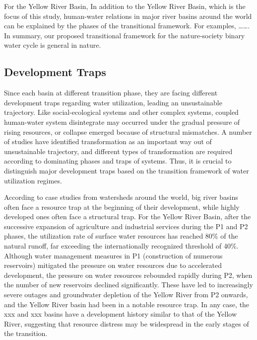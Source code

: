 \documentclass[9pt, twocolumn, twoside, lineno]{pnas-new}
\begin{document}
For the Yellow River Basin, 
In addition to the Yellow River Basin, which is the focus of this study, 
human-water relations in major river basins around the world 
can be explained by the phases of the transitional framework.
For examples, \dots \dots.
In summary, our proposed transitional framework for the nature-society binary water cycle is general in nature.

\subsection*{Development Traps}
Since each basin at different transition phase, 
they are facing different development traps regarding water utilization, 
leading an unsustainable trajectory. 
Like social-ecological systems and other complex systems, 
coupled human-water system disintegrate may occurred under the gradual pressure of rising resources, 
or collapse emerged because of structural mismatches.
A number of studies have identified transformation as an important way out of unsustainable trajectory, 
and different types of transformation are required according to dominating phases and traps of systems.
Thus, it is crucial to distinguish major development traps 
based on the transition framework of water utilization regimes.


According to case studies from watersheds around the world, 
big river basins often face a resource trap at the beginning of their development, 
while highly developed ones often face a structural trap.
For the Yellow River Basin, 
after the successive expansion of agriculture and industrial services during the P1 and P2 phases, 
the utilization rate of surface water resources has reached 80\% of the natural runoff, 
far exceeding the internationally recognized threshold of 40\%.
Although water management measures in P1 (construction of numerous reservoirs) 
mitigated the pressure on water resources due to accelerated development, 
the pressure on water resources rebounded rapidly during P2, 
when the number of new reservoirs declined significantly.
These have led to increasingly severe outages and groundwater depletion of the Yellow River from P2 onwards, 
and the Yellow River basin had been in a notable resource trap.
In any case, the xxx and xxx basins have a development history similar to that of the Yellow River, 
suggesting that resource distress may be widespread in the early stages of the transition.
\end{document}
